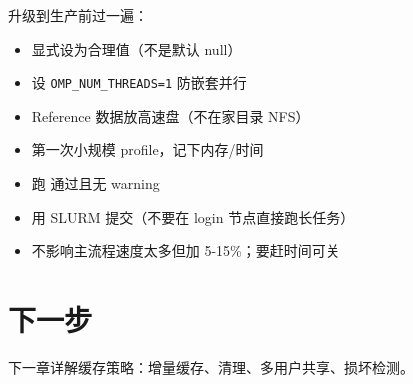升级到生产前过一遍：

\begin{itemize}
  \item {} 显式设为合理值（不是默认 null）
  \item 设 \texttt{OMP\_NUM\_THREADS=1} 防嵌套并行
  \item Reference 数据放高速盘（不在家目录 NFS）
  \item 第一次小规模 profile，记下内存/时间
  \item 跑  通过且无 warning
  \item 用 SLURM 提交（不要在 login 节点直接跑长任务）
  \item {} 不影响主流程速度太多但加 5-15\%；要赶时间可关
\end{itemize}

\section{下一步}

下一章详解缓存策略：增量缓存、清理、多用户共享、损坏检测。
